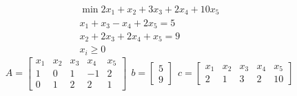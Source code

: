 \Es
\begin{gather*}
\min 2x_{1} +x_{2} +3x_{3} +2x_{4} +10x_{5}\\
x_{1} +x_{3} -x_{4} +2x_{5} =5\\
x_{2} +2x_{3} +2x_{4} +x_{5} =9\\
x_{i} \geq 0
\end{gather*}
\begin{equation*}
A=\begin{bmatrix}
x_{1} & x_{2} & x_{3} & x_{4} & x_{5}\\
1 & 0 & 1 & -1 & 2\\
0 & 1 & 2 & 2 & 1
\end{bmatrix} \ \ b=\begin{bmatrix}
5\\
9
\end{bmatrix} \ \ c=\begin{bmatrix}
x_{1} & x_{2} & x_{3} & x_{4} & x_{5}\\
2 & 1 & 3 & 2 & 10
\end{bmatrix}
\end{equation*}
